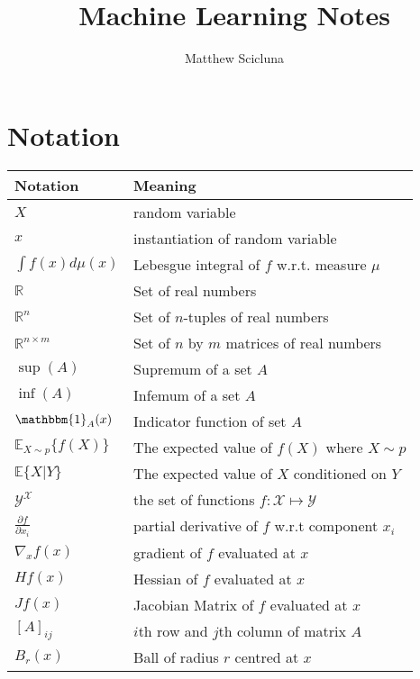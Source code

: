 \documentclass[]{article}
\theoremstyle{mattstyle}
\theoremstyle{definition}
\begin{document}
\title{Machine Learning Notes}
\author{Matthew Scicluna}
\maketitle

\newpage

\tableofcontents

\newpage

\section{Notation}

	\begin{center}		
		\begin{tabular}{*2l}   
			\toprule
			Notation & Meaning
			\\\midrule
			$X$ & random variable \\
			$x$ & instantiation of random variable\\
			$\int f(x) d\mu(x)$ & Lebesgue integral of $f$ w.r.t. measure $\mu$\\
			$\mathbb{R}$ & Set of real numbers\\
			$\mathbb{R}^n$ & Set of $n$-tuples of real numbers\\
			$\mathbb{R}^{n\times m}$ & Set of $n$ by $m$ matrices of real numbers\\
			$\sup(A)$ & Supremum of a set $A$ \\
			$\inf(A)$ & Infemum of a set $A$ \\
			$\mathbbm{1}_{A}(x)$ & Indicator function of set $A$ \\
			$\mathbb{E}_{X\sim p}\{f(X)\}$ & The expected value of $f(X)$ where $X\sim p$\\
			$\mathbb{E}\{X|Y\}$ & The expected value of $X$ conditioned on $Y$ \\
			$\mathcal{Y}^\mathcal{X}$ & the set of functions $f: \mathcal{X}\mapsto \mathcal{Y}$\\
			$\frac{\partial f}{\partial x_i}$ & partial derivative of $f$ w.r.t component $x_i$\\
			$\nabla_{x} f(x)$ & gradient of $f$ evaluated at $x$\\
			$Hf(x)$ & Hessian of $f$ evaluated at $x$\\
			$Jf(x)$ & Jacobian Matrix of $f$ evaluated at $x$\\
			$[A]_{ij}$ & $i$th row and $j$th column of matrix $A$ \\
			$B_r(x)$ & Ball of radius $r$ centred at $x$
			\\\bottomrule
			\hline
		\end{tabular}
	\end{center}
\end{document}
